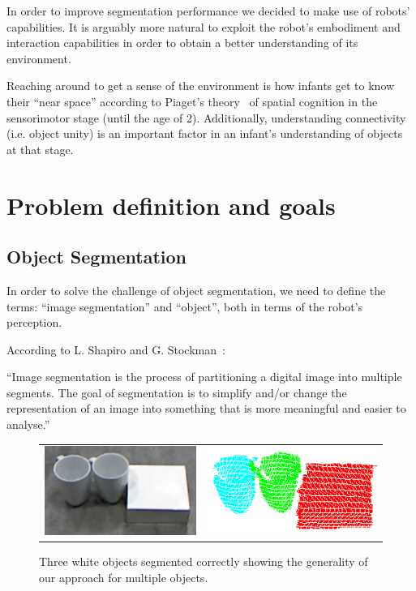 In order to improve segmentation performance we decided to make use of robots'
capabilities. It is arguably more natural to exploit the robot's embodiment
and interaction capabilities in order to obtain a better understanding of its environment.

Reaching around to get a sense of the environment is how infants get to know their
``near space'' according to Piaget's theory~\cite{infants} of spatial cognition in the sensorimotor stage 
(until the age of 2). Additionally, understanding connectivity (i.e. object unity) is an important factor in an infant's understanding of objects at that stage.











\section{Problem definition and goals}

\subsection{Object Segmentation} 

In order to solve the challenge of object segmentation, we need to define the terms: ``image segmentation'' and ``object'', both in terms of the robot's perception. 


According to L. Shapiro and G. Stockman~\cite{shapiro2001computer}:

\noindent ``Image segmentation is the process of partitioning a digital image into multiple segments. The goal of segmentation is to simplify and/or change the representation of an image into something that is more meaningful and easier to analyse.''

\begin{figure}[ht]
\begin{tabular}{cccc}

\multicolumn{2}{c}{\includegraphics[width=0.45\columnwidth]{figures/3objects/after_push.jpg}}
& \multicolumn{2}{c}{\includegraphics[width=0.45\columnwidth]{figures/3objects/segmented.png}}

\end{tabular}
\caption{Three white objects segmented correctly showing the generality of our approach for multiple objects.}
\label{fig:three_objects}
\end{figure}


